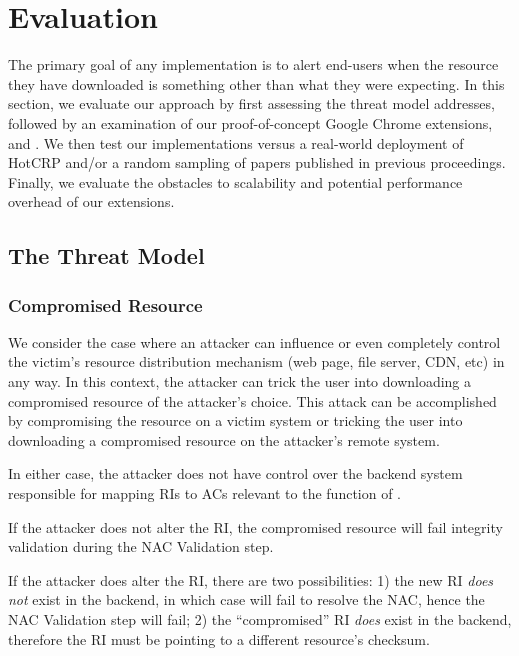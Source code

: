 \section{Evaluation} \label{sec:evaluation}

The primary goal of any \SYSTEM{} implementation is to alert end-users when the
resource they have downloaded is something other than what they were expecting.
In this section, we evaluate our approach by first assessing the threat model
\SYSTEM{} addresses, followed by an examination of our proof-of-concept Google
Chrome extensions, \DNSSYS{} and \DHTSYS{}. We then test our implementations
versus a real-world deployment of HotCRP and/or a random sampling of papers
published in previous \CONFERENCE{} proceedings. Finally, we evaluate the
obstacles to scalability and potential performance overhead of our extensions.

\subsection{The Threat Model}

\subsubsection{Compromised Resource}

We consider the case where an attacker can influence or even completely control
the victim's resource distribution mechanism (web page, file server, CDN, etc)
in any way. In this context, the attacker can trick the user into downloading a
compromised resource of the attacker's choice. This attack can be accomplished
by compromising the resource on a victim system or tricking the user into
downloading a compromised resource on the attacker's remote system.

In either case, the attacker does not have control over the backend system
responsible for mapping RIs to ACs relevant to the function of \SYSTEM{}.

If the attacker does not alter the RI, the compromised resource will fail
integrity validation during the NAC Validation step.

If the attacker does alter the RI, there are two possibilities: 1) the new RI
\textit{does not} exist in the backend, in which case \SYSTEM{} will fail to
resolve the NAC, hence the NAC Validation step will fail; 2) the ``compromised''
RI \textit{does} exist in the backend, therefore the RI must be pointing to a
different resource's checksum.

